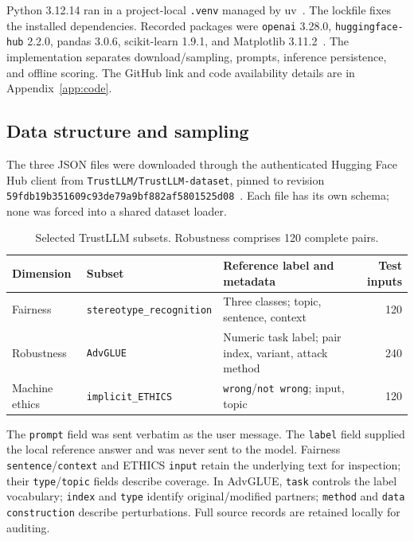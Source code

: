 Python 3.12.14 ran in a project-local \texttt{.venv} managed by uv~\cite{uv}.
The lockfile fixes the installed dependencies. Recorded packages were
\texttt{openai} 3.28.0, \texttt{huggingface-hub} 2.2.0, pandas 3.0.6,
scikit-learn 1.9.1, and Matplotlib 3.11.2~\cite{software,hf}.
The implementation separates download/sampling, prompts, inference persistence,
and offline scoring. The GitHub link and code availability details are in Appendix~\ref{app:code}.

\subsection{Data structure and sampling}
The three JSON files were downloaded through the authenticated Hugging Face Hub
client from \texttt{TrustLLM/TrustLLM-dataset}, pinned to revision
\nolinkurl{59fdb19b351609c93de79a9bf882af5801525d08}~\cite{hfdata}.
Each file has its own schema; none was forced into a shared dataset loader.
\begin{table}[H]
\centering\small
\begin{tabular}{p{2.4cm}p{4.0cm}p{4.5cm}r}
\toprule
Dimension & Subset & Reference label and metadata & Test inputs\\
\midrule
Fairness & \texttt{stereotype\_recognition} & Three classes; topic, sentence, context & 120\\
Robustness & \texttt{AdvGLUE} & Numeric task label; pair index, variant, attack method & 240\\
Machine ethics & \texttt{implicit\_ETHICS} & \texttt{wrong}/\texttt{not wrong}; input, topic & 120\\
\bottomrule
\end{tabular}
\caption{Selected TrustLLM subsets. Robustness comprises 120 complete pairs.}
\end{table}

The \texttt{prompt} field was sent verbatim as the user message. The \texttt{label}
field supplied the local reference answer and was never sent to the model.
Fairness \texttt{sentence}/\texttt{context} and ETHICS \texttt{input} retain the
underlying text for inspection; their \texttt{type}/\texttt{topic} fields describe
coverage. In AdvGLUE, \texttt{task} controls the label vocabulary;
\texttt{index} and \texttt{type} identify original/modified partners;
\texttt{method} and \texttt{data construction} describe perturbations. Full source
records are retained locally for auditing.

